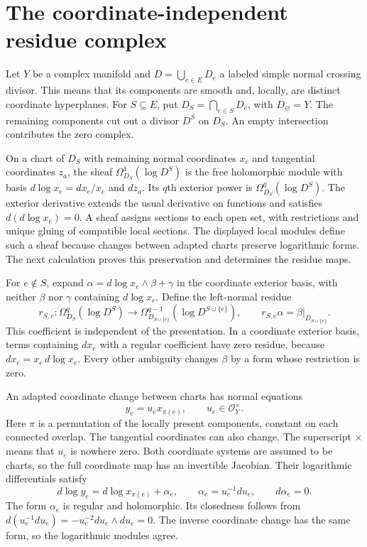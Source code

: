 \section{The coordinate-independent residue complex}
\label{sec:residue-sheaf}

Let $Y$ be a complex manifold and $D=\bigcup_{e\in E}D_e$ a labeled simple normal crossing divisor.
This means that its components are smooth and, locally, are distinct coordinate hyperplanes.
For $S\subseteq E$, put
$D_S=\bigcap_{e\in S}D_e$, with $D_\varnothing=Y$.
The remaining components cut out a divisor $D^S$ on $D_S$.
An empty intersection contributes the zero complex.

On a chart of $D_S$ with remaining normal coordinates $x_e$ and tangential coordinates $z_a$,
the sheaf $\Omega^1_{D_S}(\log D^S)$ is the free holomorphic module with basis
$d\log x_e=dx_e/x_e$ and $dz_a$.
Its $q$th exterior power is $\Omega^q_{D_S}(\log D^S)$.
The exterior derivative extends the usual derivative on functions and satisfies
$d(d\log x_e)=0$.
A sheaf assigns sections to each open set, with restrictions and unique gluing of compatible local sections.
The displayed local modules define such a sheaf because changes between adapted charts preserve logarithmic forms.
The next calculation proves this preservation and determines the residue maps.

For $e\notin S$, expand $\alpha=d\log x_e\wedge\beta+\gamma$ in the coordinate exterior basis,
with neither $\beta$ nor $\gamma$ containing $d\log x_e$.
Define the left-normal residue
\begin{equation}
\label{eq:residue-definition}
r_{S,e}:\Omega^q_{D_S}(\log D^S)
\longrightarrow\Omega^{q-1}_{D_{S\cup\{e\}}}(\log D^{S\cup\{e\}}),
\qquad r_{S,e}\alpha=\beta|_{D_{S\cup\{e\}}}.
\end{equation}
This coefficient is independent of the presentation.
In a coordinate exterior basis, terms containing $dx_e$ with a regular coefficient have zero residue,
because $dx_e=x_e\,d\log x_e$.
Every other ambiguity changes $\beta$ by a form whose restriction is zero.

An adapted coordinate change between charts has normal equations
\begin{equation}
\label{eq:adapted-change}
y_e=u_e x_{\pi(e)},\qquad u_e\in\mathcal O_Y^\times.
\end{equation}
Here $\pi$ is a permutation of the locally present components, constant on each connected overlap.
The tangential coordinates can also change.
The superscript $\times$ means that $u_e$ is nowhere zero.
Both coordinate systems are assumed to be charts, so the full coordinate map has an invertible Jacobian.
Their logarithmic differentials satisfy
\begin{equation}
\label{eq:unit-differential}
d\log y_e=d\log x_{\pi(e)}+\alpha_e,
\qquad \alpha_e=u_e^{-1}du_e,\qquad d\alpha_e=0.
\end{equation}
The form $\alpha_e$ is regular and holomorphic.
Its closedness follows from
$d(u_e^{-1}du_e)=-u_e^{-2}du_e\wedge du_e=0$.
The inverse coordinate change has the same form, so the logarithmic modules agree.


